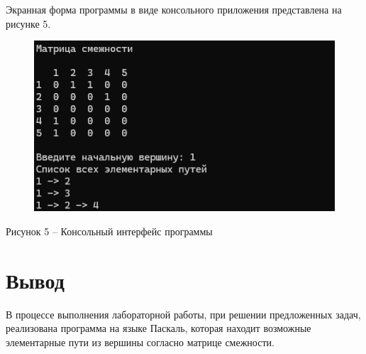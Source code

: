 \documentclass[a4paper,14pt]{extarticle}
\begin{document}
  \pagebreak
  Экранная форма программы в виде консольного приложения представлена на рисунке 5.

  \begin{figure}[h]
    \centering
    \includegraphics[width=0.8\linewidth]{images/image.png}
  \end{figure}
  \begin{center}
    Рисунок 5 – Консольный интерфейс программы
  \end{center}

  \section*{\hspace{12.5mm}Вывод}
  В процессе выполнения лабораторной работы, при решении предложенных задач, реализована программа на языке Паскаль, которая находит возможные элементарные пути из вершины согласно матрице смежности.
\end{document}
